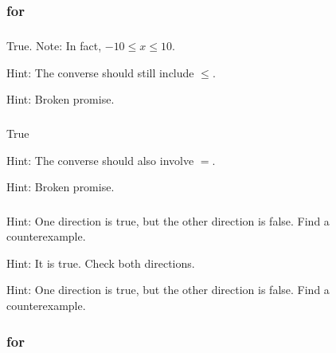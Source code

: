 \subsection{\answers}

\subsubsection{\answers for  \subconv}

\subsubsection*{ \answers}
\begin{apart}
    \item True. Note: In fact, $-10 \le x \le 10$.
    \item Hint:  The converse should still include $\le$.
    \item Hint: Broken promise.
\end{apart}

\subsubsection*{ \answers}
\begin{apart}
    \item True
    \item Hint: The converse should also involve $=$.
    \item Hint: Broken promise.
\end{apart}

\subsubsection*{ \answers}
\begin{apart}
    \item Hint: One direction is true, but the other direction is false.  Find a counterexample.
    \item Hint: It is true.  Check both directions.
    \item Hint: One direction is true, but the other direction is false.  Find a counterexample.
\end{apart}

\subsubsection{\answers for  \subpffiff}

